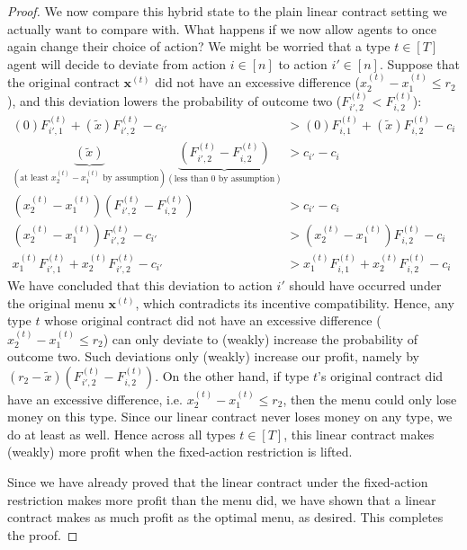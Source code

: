 \documentclass{article}
\newcommand{\cost}[1]{c_{#1}}
\newcommand{\TypedForecast}[3]{F^{(#1)}_{#2, #3}}
\newcommand{\reward}[1]{r_{#1}}
\newcommand{\TypedContract}[2]{x^{(#1)}_{#2}}
\newcommand{\TypedContractVector}[1]{\bm{x}^{(#1)}}
\begin{document}
\begin{proof}
  We now compare this hybrid state to the plain linear contract setting we actually want to compare with. What happens if we now allow agents to once again change their choice of action? We might be worried that a type $t \in [T]$ agent will decide to deviate from action $i \in [n]$ to action $i' \in [n]$. Suppose that the original contract $\TypedContractVector{t}$ did not have an excessive difference ($\TypedContract{t}{2} - \TypedContract{t}{1} \le \reward{2}$), and this deviation lowers the probability of outcome two ($\TypedForecast{t}{i'}{2} < \TypedForecast{t}{i}{2}$):
  \begin{align*}
    (0) \TypedForecast{t}{i'}{1} + (\tilde{x}) \TypedForecast{t}{i'}{2} - \cost{i'}
      &> (0) \TypedForecast{t}{i}{1} + (\tilde{x}) \TypedForecast{t}{i}{2} - \cost{i} \\
    \underbrace{(\tilde{x})}_{(\text{at least } \TypedContract{t}{2} - \TypedContract{t}{1} \text{ by assumption})}
      \underbrace{\left( \TypedForecast{t}{i'}{2} - \TypedForecast{t}{i}{2} \right)}_{(\text{less than } 0 \text{ by assumption})}
      &> \cost{i'} - \cost{i} \\
    \left(\TypedContract{t}{2} - \TypedContract{t}{1}\right)
      \left( \TypedForecast{t}{i'}{2} - \TypedForecast{t}{i}{2} \right)
      &> \cost{i'} - \cost{i} \\
    \left(\TypedContract{t}{2} - \TypedContract{t}{1}\right) \TypedForecast{t}{i'}{2} - \cost{i'}
      &> \left(\TypedContract{t}{2} - \TypedContract{t}{1}\right) \TypedForecast{t}{i}{2} - \cost{i} \\
    \TypedContract{t}{1} \TypedForecast{t}{i'}{1} + \TypedContract{t}{2} \TypedForecast{t}{i'}{2} - \cost{i'}
      &> \TypedContract{t}{1} \TypedForecast{t}{i}{1} + \TypedContract{t}{2} \TypedForecast{t}{i}{2} - \cost{i}
  \end{align*}
  We have concluded that this deviation to action $i'$ should have occurred under the original menu $\TypedContractVector{t}$, which contradicts its incentive compatibility. Hence, any type $t$ whose original contract did not have an excessive difference ($\TypedContract{t}{2} - \TypedContract{t}{1} \le \reward{2}$) can only deviate to (weakly) increase the probability of outcome two. Such deviations only (weakly) increase our profit, namely by $(\reward{2} - \tilde{x}) \left(\TypedForecast{t}{i'}{2} - \TypedForecast{t}{i}{2}\right)$. On the other hand, if type $t$'s original contract did have an excessive difference, i.e. $\TypedContract{t}{2} - \TypedContract{t}{1} \le \reward{2}$, then the menu could only lose money on this type. Since our linear contract never loses money on any type, we do at least as well. Hence across all types $t \in [T]$, this linear contract makes (weakly) more profit when the fixed-action restriction is lifted.
  
  Since we have already proved that the linear contract under the fixed-action restriction makes more profit than the menu did, we have shown that a linear contract makes as much profit as the optimal menu, as desired. This completes the proof.
\end{proof}%
\end{document}
